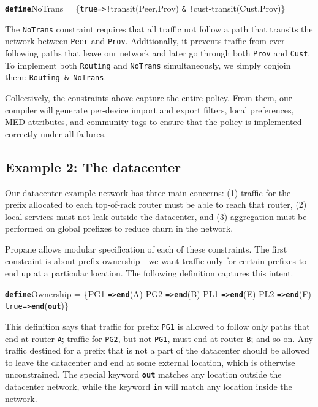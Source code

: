 \documentclass[10pt]{sigalternate052015}
\newcommand{\sysname}{{\small \sf Propane}\xspace}
\newcommand{\CD}[1]{\texttt{\small #1}}  %
\newcommand{\KW}[1]{\texttt{\small\bfseries{#1}}}
\newcommand{\True}{\CD{true}}
\newcommand{\Define}{\KW{define}}
\newcommand{\Path}{\texttt{=>}}
\newcommand{\In}{\KW{in}}
\newcommand{\Out}{\KW{out}}
\newcommand{\AND}{\texttt{\&}}
\newcommand{\NOT}{\texttt{!}}
\newcommand{\End}{\KW{end}}
\renewcommand{\path}[2]{ #1 \mapsto \ensuremath{#2} }
\begin{document}
\begin{code}
\Define NoTrans =
  \{\True \Path \NOT{}transit(Peer,Prov) \AND
           \NOT{}cust-transit(Cust,Prov)\}
\end{code}
\noindent
The \CD{NoTrans} constraint requires that all traffic not follow a path that transits the network between \CD{Peer} and \CD{Prov}.
Additionally, it prevents traffic from ever following paths that leave our network and later go through both \CD{Prov} and \CD{Cust}.  To implement both \CD{Routing}
and \CD{NoTrans} simultaneously, we simply conjoin them: \CD{Routing \AND{} NoTrans}.
%
%

Collectively, the constraints above capture the entire policy. From them, our compiler will generate per-device import and export filters, local preferences,
MED attributes, and community tags to ensure that the policy is
implemented correctly under all failures.

\subsection{Example 2: The datacenter}

Our datacenter example network has three main concerns:
(1) traffic for the prefix allocated to each top-of-rack router must be able to reach that router,
(2) local services must not leak outside the datacenter, and
(3) aggregation must be performed on global prefixes to reduce churn
in the network.

\sysname allows modular specification of each of these constraints. The first constraint is about prefix ownership---we want traffic only for certain prefixes to end up at a particular location. The following definition captures this intent.


\begin{code}
\Define Ownership =
    \{PG1 \Path \End(A)
     PG2 \Path \End(B)
     PL1 \Path \End(E)
     PL2 \Path \End(F)
     \True \Path \End(\Out)\}
\end{code}
\noindent
This definition says that traffic for prefix \CD{PG1} is allowed to follow only paths that
end at router \CD{A}; traffic for \CD{PG2},
but not \CD{PG1}, must
end at router \CD{B}; and so on.
Any traffic destined for a prefix that is not a part of the datacenter should be allowed to leave the datacenter and end at some external location, which is otherwise unconstrained.
The special keyword \Out{} matches any location outside the datacenter network, while the keyword \In{} will match any location inside the network.
\end{document}
